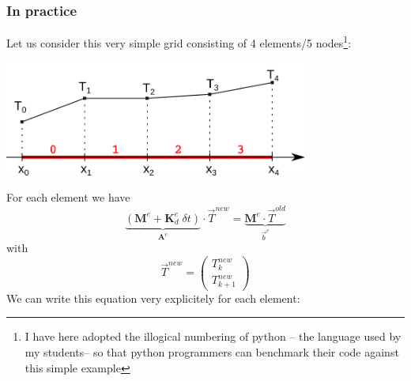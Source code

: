 \subsubsection{In practice}

Let us consider this very simple grid consisting of 4 elements/5 nodes\footnote{I have here adopted the illogical 
numbering of python -- the language used by my students-- 
so that python programmers can benchmark their code against this simple example}:
\begin{center}
\includegraphics[width=10cm]{images/oneD/grid5}
\end{center}
For each element we have 
\[
\underbrace{( {\bm M}^e +  {\bm K}_d^e \; \delta t )}_{\bm A^{e}} \cdot {\vec T}^{new} =  
\underbrace{{\bm M}^e \cdot  {\vec T}^{old} }_{\vec b^{e}}
\]
with 
\[
\vec{T}^{new}=
\left(
\begin{array}{c}
T_k^{new} \\ T_{k+1}^{new}
\end{array}
\right)
\]
We can write this equation very explicitely for each element:
